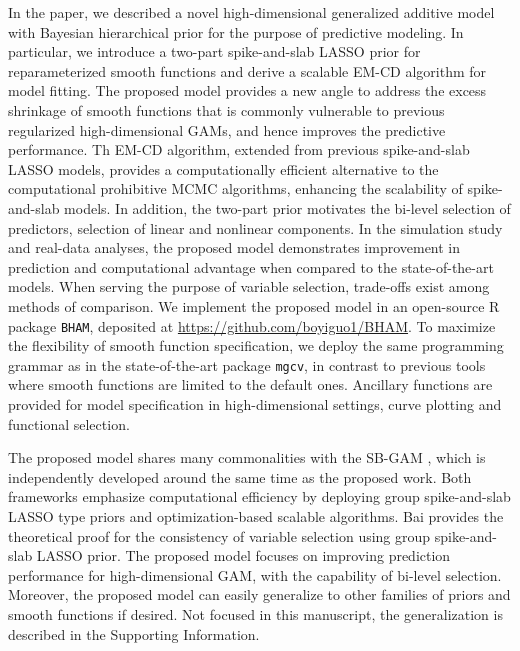 \documentclass[AMA,STIX1COL,]{WileyNJD-v2}
\begin{document}
In the paper, we described a novel high-dimensional generalized additive
model with Bayesian hierarchical prior for the purpose of predictive
modeling. In particular, we introduce a two-part spike-and-slab LASSO
prior for reparameterized smooth functions and derive a scalable EM-CD
algorithm for model fitting. The proposed model provides a new angle to
address the excess shrinkage of smooth functions that is commonly
vulnerable to previous regularized high-dimensional GAMs, and hence
improves the predictive performance. Th EM-CD algorithm, extended from
previous spike-and-slab LASSO models, provides a computationally
efficient alternative to the computational prohibitive MCMC algorithms,
enhancing the scalability of spike-and-slab models. In addition, the
two-part prior motivates the bi-level selection of predictors, selection
of linear and nonlinear components. In the simulation study and
real-data analyses, the proposed model demonstrates improvement in
prediction and computational advantage when compared to the
state-of-the-art models. When serving the purpose of variable selection,
trade-offs exist among methods of comparison. We implement the proposed
model in an open-source R package \texttt{BHAM}, deposited at
\url{https://github.com/boyiguo1/BHAM}. To maximize the flexibility of
smooth function specification, we deploy the same programming grammar as
in the state-of-the-art package \texttt{mgcv}, in contrast to previous
tools where smooth functions are limited to the default ones. Ancillary
functions are provided for model specification in high-dimensional
settings, curve plotting and functional selection.

The proposed model shares many commonalities with the SB-GAM
\citep{Bai2021}, which is independently developed around the same time
as the proposed work. Both frameworks emphasize computational efficiency
by deploying group spike-and-slab LASSO type priors and
optimization-based scalable algorithms. Bai provides the theoretical
proof for the consistency of variable selection using group
spike-and-slab LASSO prior. The proposed model focuses on improving
prediction performance for high-dimensional GAM, with the capability of
bi-level selection. Moreover, the proposed model can easily generalize
to other families of priors and smooth functions if desired. Not focused
in this manuscript, the generalization is described in the Supporting
Information.
\end{document}
